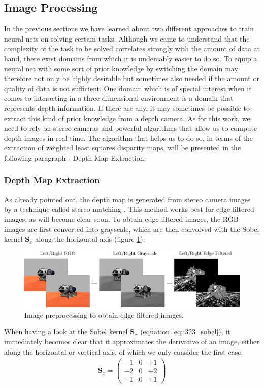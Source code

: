 \subsection{Image Processing}
In the previous sections we have learned about two different approaches to train neural nets on solving certain tasks. Although we came to understand that the complexity of the task to be solved correlates strongly with the amount of data at hand, there exist domains from which it is undeniably easier to do so. To equip a neural net with some sort of prior knowledge by switching the domain may therefore not only be highly desirable but sometimes also needed if the amount or quality of data is not sufficient. One domain which is of special interest when it comes to interacting in a three dimensional environment is a domain that represents depth information. If there are any, it may sometimes be possible to extract this kind of prior knowledge from a depth camera. As for this work, we need to rely on stereo cameras and powerful algorithms that allow us to compute depth images in real time. The algorithm that helps us to do so, in terms of the extraction of weighted least squares disparity maps, will be presented in the following paragraph - Depth Map Extraction.
\subsubsection{Depth Map Extraction}
As already pointed out, the depth map is generated from stereo camera images by a technique called stereo matching \cite{hamzah2010sum}. This method works best for edge filtered images, as will become clear soon. To obtain edge filtered images, the RGB images are first converted into grayscale, which are then convolved with the Sobel kernel $\bm{S}_x$ along the horizontal axis \cite{sobel2014an} (figure \ref{fig::323_image_preprocessing}). 
\begin{figure}[h]
	\centering
	\includegraphics[scale=.28]{chapters/03_background/img/image_preprocessing.png}
	\caption{Image preprocessing to obtain edge filtered images.}
	\label{fig::323_image_preprocessing}
\end{figure}
When having a look at the Sobel kernel $\bm{S}_x$ (equation \ref{eq::323_sobel}), it immediately becomes clear that it approximates the derivative of an image, either along the horizontal or vertical axis, of which we only consider the first case.
\begin{align}
	\bm{S}_x=
	\begin{pmatrix}
		-1 & 0 & +1 \\
		-2 & 0 & +2 \\
		-1 & 0 & +1
	\end{pmatrix}
	\label{eq::323_sobel}
\end{align}

